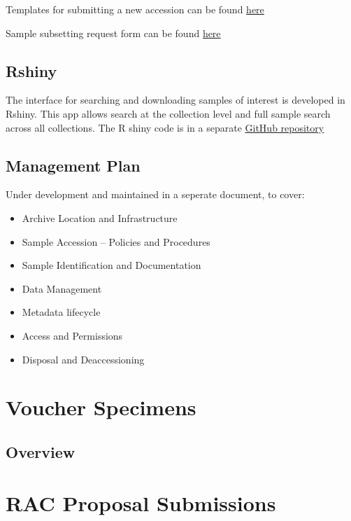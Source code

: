 \documentclass[
  letterpaper,
  DIV=11,
  numbers=noendperiod]{scrreprt}
\providecommand{\tightlist}{%
  \setlength{\itemsep}{0pt}\setlength{\parskip}{0pt}}\usepackage{longtable,booktabs,array}
\begin{document}
Templates for submitting a new accession can be found \href{link}{here}

Sample subsetting request form can be found
\href{subsampling_request.pdf}{here}

\section{Rshiny}\label{rshiny}

The interface for searching and downloading samples of interest is
developed in Rshiny. This app allows search at the collection level and
full sample search across all collections. The R shiny code is in a
separate \href{link}{GitHub repository}

\section{Management Plan}\label{management-plan}

Under development and maintained in a seperate document, to cover:

\begin{itemize}
\tightlist
\item
  Archive Location and Infrastructure
\item
  Sample Accession -- Policies and Procedures
\item
  Sample Identification and Documentation
\item
  Data Management
\item
  Metadata lifecycle
\item
  Access and Permissions
\item
  Disposal and Deaccessioning
\end{itemize}


\chapter{Voucher Specimens}\label{voucher-specimens}

\section{Overview}\label{overview-5}


\chapter{RAC Proposal Submissions}\label{rac-proposal-submissions}
\end{document}
